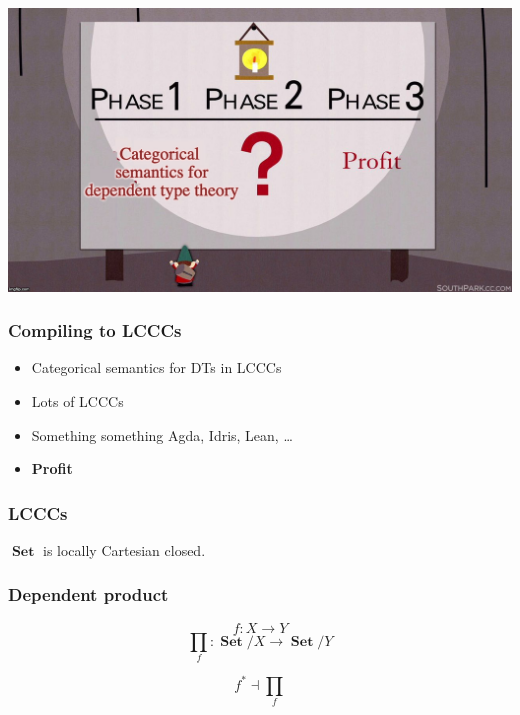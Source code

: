 \documentclass[
  xcolor={usenames,dvipsnames,svgnames},
  ]{beamer}
\DeclareMathOperator{\Set}{\mathbf{Set}}
\begin{document}
{\usebackgroundtemplate%
{%
\parbox[c][\paperheight][c]{\paperwidth}{\centering\includegraphics[width=\paperwidth]{graphics/profit.jpg}}
}
\begin{frame}
\end{frame}
}

\begin{frame}
  \frametitle{Compiling to LCCCs}
  \begin{itemize}
    \item Categorical semantics for DTs in LCCCs
    \item Lots of LCCCs
    \item Something something Agda, Idris, Lean, \dots
    \item \textbf{Profit}
  \end{itemize}
\end{frame}

\begin{frame}
  \frametitle{LCCCs}
  \begin{center}
    $\Set$
    is locally Cartesian closed.
  \end{center}
\end{frame}

\begin{frame}
  \frametitle{Dependent product}
  \begin{center}

    \[
      f : X \to Y
    \]
    \[
      \prod_f: \Set/X \to \Set/Y
    \]

    \[
     f^\ast \dashv \prod_f
    \]


  \end{center}
\end{frame}
\end{document}
